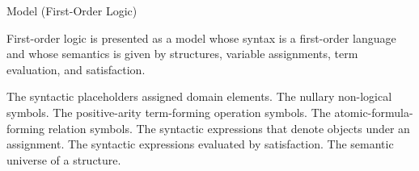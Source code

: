 \begin{modelbox}{Model (First-Order Logic)}
\begin{model}\label{model:first-order-logic}

First-order logic is presented as a model whose syntax is a first-order
language and whose semantics is given by structures, variable assignments, term
evaluation, and satisfaction.

\begin{modelsorts}
    {The syntactic placeholders assigned domain elements.}
    {The nullary non-logical symbols.}
    {The positive-arity term-forming operation symbols.}
    {The atomic-formula-forming relation symbols.}
    {The syntactic expressions that denote objects under an assignment.}
    {The syntactic expressions evaluated by satisfaction.}
    {The semantic universe of a structure.}
\end{modelsorts}

\begin{modelconstants}
\end{modelconstants}

\begin{modelarity}
\end{modelarity}


\end{model}
\end{modelbox}
